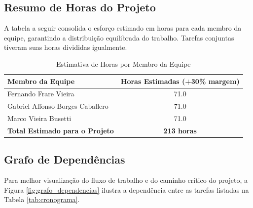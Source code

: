 \documentclass[a4paper,12pt]{article}
\begin{document}
\subsection{Resumo de Horas do Projeto}
A tabela a seguir consolida o esforço estimado em horas para cada membro da equipe, garantindo a distribuição equilibrada do trabalho. Tarefas conjuntas tiveram suas horas divididas igualmente.

\begin{table}[H]
    \centering
    \caption{Estimativa de Horas por Membro da Equipe}
    \label{tab:horas}
    \renewcommand{\arraystretch}{1.2}
    \begin{tabular}{l c}
        \toprule
        \textbf{Membro da Equipe} & \textbf{Horas Estimadas (+30\% margem)} \\
        \midrule
        Fernando Frare Vieira & 71.0 \\
        Gabriel Affonso Borges Caballero & 71.0 \\
        Marco Vieira Busetti & 71.0 \\
        \midrule
        \textbf{Total Estimado para o Projeto} & \textbf{213 horas} \\
        \bottomrule
    \end{tabular}
\end{table}

\subsection{Grafo de Dependências}
Para melhor visualização do fluxo de trabalho e do caminho crítico do projeto, a Figura \ref{fig:grafo_dependencias} ilustra a dependência entre as tarefas listadas na Tabela \ref{tab:cronograma}.
\end{document}
